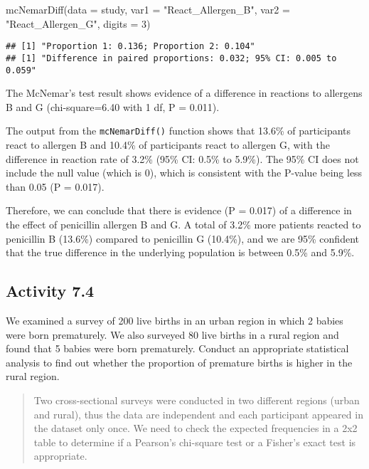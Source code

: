 \documentclass[
]{memoir}
\newenvironment{Shaded}{\begin{snugshade}}{\end{snugshade}}
\newcommand{\AttributeTok}[1]{\textcolor[rgb]{0.77,0.63,0.00}{#1}}
\newcommand{\DecValTok}[1]{\textcolor[rgb]{0.00,0.00,0.81}{#1}}
\newcommand{\FunctionTok}[1]{\textcolor[rgb]{0.00,0.00,0.00}{#1}}
\newcommand{\NormalTok}[1]{#1}
\newcommand{\StringTok}[1]{\textcolor[rgb]{0.31,0.60,0.02}{#1}}
\begin{document}
\begin{Shaded}
\begin{Highlighting}[]
\FunctionTok{mcNemarDiff}\NormalTok{(}\AttributeTok{data =}\NormalTok{ study, }\AttributeTok{var1 =} \StringTok{"React\_Allergen\_B"}\NormalTok{, }\AttributeTok{var2 =} \StringTok{"React\_Allergen\_G"}\NormalTok{, }\AttributeTok{digits =} \DecValTok{3}\NormalTok{)}
\end{Highlighting}
\end{Shaded}

\begin{verbatim}
## [1] "Proportion 1: 0.136; Proportion 2: 0.104"
## [1] "Difference in paired proportions: 0.032; 95% CI: 0.005 to 0.059"
\end{verbatim}

The McNemar's test result shows evidence of a difference in reactions to allergens B and G (chi-square=6.40 with 1 df, P = 0.011).

The output from the \texttt{mcNemarDiff()} function shows that 13.6\% of participants react to allergen B and 10.4\% of participants react to allergen G, with the difference in reaction rate of 3.2\% (95\% CI: 0.5\% to 5.9\%). The 95\% CI does not include the null value (which is 0), which is consistent with the P-value being less than 0.05 (P = 0.017).

Therefore, we can conclude that there is evidence (P = 0.017) of a difference in the effect of penicillin allergen B and G. A total of 3.2\% more patients reacted to penicillin B (13.6\%) compared to penicillin G (10.4\%), and we are 95\% confident that the true difference in the underlying population is between 0.5\% and 5.9\%.

\hypertarget{activity-7.4}{%
\subsection*{Activity 7.4}\label{activity-7.4}}

We examined a survey of 200 live births in an urban region in which 2 babies were born prematurely. We also surveyed 80 live births in a rural region and found that 5 babies were born prematurely. Conduct an appropriate statistical analysis to find out whether the proportion of premature births is higher in the rural region.

\begin{quote}
Two cross-sectional surveys were conducted in two different regions (urban and rural), thus the data are independent and each participant appeared in the dataset only once. We need to check the expected frequencies in a 2x2 table to determine if a Pearson's chi-square test or a Fisher's exact test is appropriate.
\end{quote}
\end{document}
